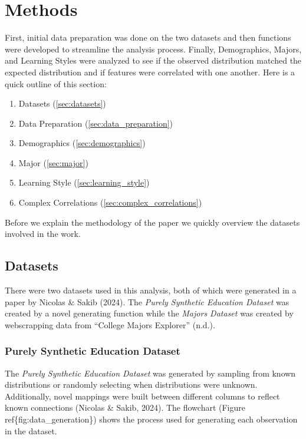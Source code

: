 \documentclass{article}
\providecommand{\tightlist}{%
  \setlength{\itemsep}{0pt}\setlength{\parskip}{0pt}}
\begin{document}
\section{Methods}\label{methods}

First, initial data preparation was done on the two datasets and then functions were developed to streamline the analysis process. Finally, Demographics, Majors, and Learning Styles were analyzed to see if the observed distribution matched the expected distribution and if features were correlated with one another. Here is a quick outline of this section:

\begin{enumerate}
\def\labelenumi{\arabic{enumi}.}
\tightlist
\item
  Datasets (\ref{sec:datasets})
\item
  Data Preparation (\ref{sec:data_preparation})
\item
  Demographics (\ref{sec:demographics})
\item
  Major (\ref{sec:major})
\item
  Learning Style (\ref{sec:learning_style})
\item
  Complex Correlations (\ref{sec:complex_correlations})
\end{enumerate}

Before we explain the methodology of the paper we quickly overview the datasets involved in the work.

\subsection{Datasets}\label{datasets}

\label{sec:datasets}

There were two datasets used in this analysis, both of which were generated in a paper by Nicolas \& Sakib (2024). The \emph{Purely Synthetic Education Dataset} was created by a novel generating function while the \emph{Majors Dataset} was created by webscrapping data from {``College {Majors Explorer}''} (n.d.).

\subsubsection{Purely Synthetic Education Dataset}\label{purely-synthetic-education-dataset}

The \emph{Purely Synthetic Education Dataset} was generated by sampling from known distributions or randomly selecting when distributions were unknown. Additionally, novel mappings were built between different columns to reflect known connections (Nicolas \& Sakib, 2024). The flowchart (Figure ref\{fig:data\_generation\}) shows the process used for generating each observation in the dataset.
\end{document}
